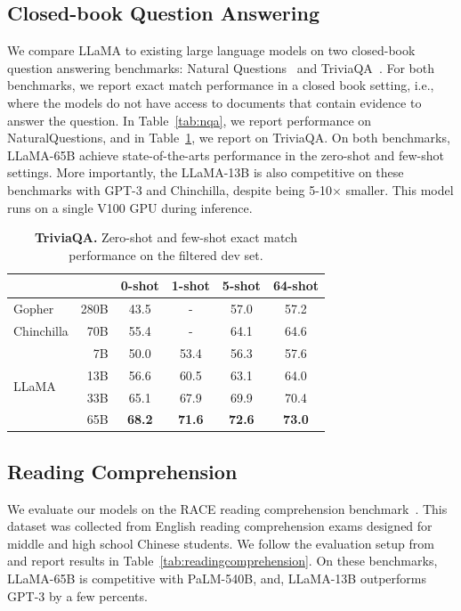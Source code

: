\documentclass[11pt]{article}
\newcommand{\model}{LLaMA\xspace}
\begin{document}
\subsection{Closed-book Question Answering}

We compare \model to existing large language models on two closed-book question answering benchmarks: Natural Questions~\citep{kwiatkowski2019natural} and TriviaQA~\cite{joshi2017triviaqa}.
For both benchmarks, we report exact match performance in a closed book setting, i.e., where the models do not have access to documents that contain evidence to answer the question.
In Table~\ref{tab:nqa}, we report performance on NaturalQuestions, and in Table~\ref{tab:tqa}, we report on TriviaQA.
On both benchmarks, \model-65B achieve state-of-the-arts performance in the zero-shot and few-shot settings.
More importantly, the \model-13B is also competitive on these benchmarks with GPT-3 and Chinchilla, despite being 5-10$\times$ smaller. 
This model runs on a single V100 GPU during inference.

\begin{table}[h]
  \centering
  \setlength{\tabcolsep}{4pt}
   {
  \begin{tabular}{@{}l@{} r cccc@{}}
    \toprule
&& 0-shot & 1-shot & 5-shot & 64-shot\\
    \midrule
    Gopher     & 280B & 43.5 & - & 57.0 & 57.2 \\
    Chinchilla & 70B  & 55.4 & - & 64.1 & 64.6 \\
    \midrule
    \multirow{4}{*}{\model}
                & 7B   &	50.0 & 53.4 &	56.3 &	57.6 \\
                & 13B  &	56.6 & 60.5 &	63.1 &	64.0 \\
                & 33B  &	65.1 & 67.9 &	69.9 &	70.4 \\
                & 65B  &    \bf{68.2} & \bf{71.6} &	\bf{72.6} &	\bf{73.0}   \\
    \bottomrule
  \end{tabular}}
  \caption{
  \textbf{TriviaQA.} Zero-shot and few-shot exact match performance on the filtered dev set.
  \label{tab:tqa}
  }
\end{table}

\subsection{Reading Comprehension}
We evaluate our models on the RACE reading comprehension benchmark~\citep{lai2017race}.
This dataset was collected from English reading comprehension exams designed for middle and high school Chinese students.
We follow the evaluation setup from~\citet{brown2020gpt3}
and report results in Table~\ref{tab:readingcomprehension}.
On these benchmarks, \model-65B is competitive with PaLM-540B, and, \model-13B outperforms GPT-3 by a few percents.
\end{document}
